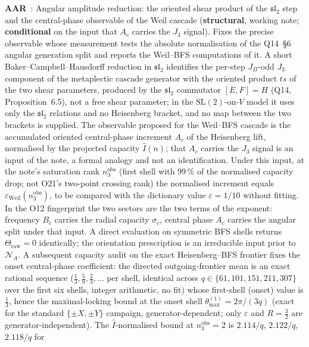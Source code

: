 \documentclass[11pt,a4paper]{article}
\newcommand{\sstruct}{\textcolor{cstruct}{\textbf{structural}}}
\newcommand{\scond}{\textcolor{ccond}{\textbf{conditional}}}
\begin{document}
    \textbf{AAR}~\cite{Beau2026aar}: Angular amplitude reduction: the oriented shear product of the $\mathfrak{sl}_2$
    step and the central-phase observable of the Weil cascade (\sstruct, working note; \scond{} on the input that $A_c$
    carries the $J_3$ signal).
    Fixes the precise observable whose measurement tests the absolute normalisation of the Q14~\S6 angular
    generation split and reports the Weil--BFS computations of it.
    A short Baker--Campbell--Hausdorff reduction in $\mathfrak{sl}_2$ identifies the per-step $J_\Pi$-odd $J_3$
    component of the metaplectic cascade generator with the oriented product $ts$ of the two shear parameters,
    produced by the $\mathfrak{sl}_2$ commutator $[E,F]=H$ (Q14, Proposition~6.5), not a free shear parameter; in the
    $\mathrm{SL}(2)$-on-$V$ model it uses only the $\mathfrak{sl}_2$ relations and no Heisenberg bracket, and no map
    between the two brackets is supplied.
    The observable proposed for the Weil--BFS cascade is the accumulated oriented central-phase increment $A_c$ of the
    Heisenberg lift, normalised by the projected capacity $\widehat I(n)$; that $A_c$ carries the $J_3$ signal is an
    input of the note, a formal analogy and not an identification.
    Under this input, at the note's saturation rank $n_3^{\mathrm{obs}}$ (first shell with $99\,\%$ of the
    normalised capacity drop; not O21's two-point crossing rank) the normalised increment equals
    $\varepsilon_{\mathrm{Weil}}(n_3^{\mathrm{obs}})$, to be compared with the dictionary value
    $\varepsilon = 1/10$ without fitting.
    In the O12 fingerprint the two sectors are the two terms of the exponent: frequency $B_c$ carries the radial
    capacity $\sigma_c$, central phase $A_c$ carries the angular split under that input.
    A direct evaluation on symmetric BFS shells returns $\Theta_{\mathrm{raw}} = 0$ identically; the orientation
    prescription is an irreducible input prior to $\mathcal{N}_A$.
    A subsequent capacity audit on the exact Heisenberg--BFS frontier fixes the onset central-phase coefficient: the
    directed outgoing-frontier mean is an exact rational sequence ($\tfrac13,\tfrac59,\tfrac23,\dots$ per
    shell, identical across $q \in \{61,101,151,211,307\}$ over the first six shells, integer arithmetic, no fit) whose first-shell (onset) value
    is $\tfrac13$, hence the maximal-locking bound at the onset shell $\theta_{\max}^{(1)} = 2\pi/(3q)$ (exact for the
    standard $\{\pm X,\pm Y\}$ campaign, generator-dependent; only $\varepsilon$ and $R = \tfrac32$ are
    generator-independent).
    The $\widehat I$-normalised bound at $n_3^{\mathrm{obs}} = 2$ is $2.114/q$, $2.122/q$, $2.118/q$ for
\end{document}
